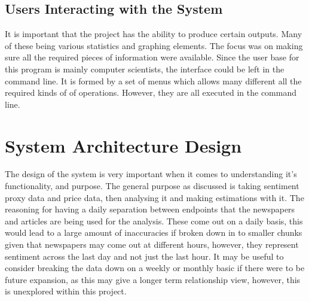 \subsection{Users Interacting with the System}

It is important that the project has the ability to produce certain outputs. Many of these being various statistics and graphing elements. The focus was on making sure all the required pieces of information were available. Since the user base for this program is mainly computer scientists, the interface could be left in the command line. It is formed by a set of menus which allows many different all the required kinds of of operations. However, they are all executed in the command line.

\section{System Architecture Design}

The design of the system is very important when it comes to understanding it's functionality, and purpose. The general purpose as discussed is taking sentiment proxy data and price data, then analysing it and making estimations with it. The reasoning for having a daily separation between endpoints that the newspapers and articles are being used for the analysis. These come out on a daily basis, this would lead to a large amount of inaccuracies if broken down in to smaller chunks given that newspapers may come out at different hours, however, they represent sentiment across the last day and not just the last hour. It may be useful to consider breaking the data down on a weekly or monthly basic if there were to be future expansion, as this may give a longer term relationship view, however, this is unexplored within this project.

